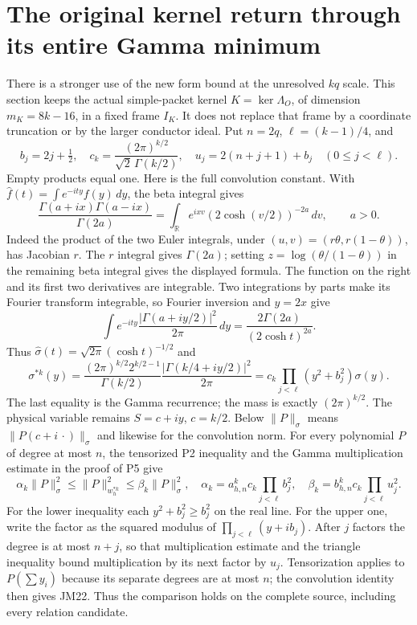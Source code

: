 \section{The original kernel return through its entire Gamma minimum}
There is a stronger use of the new form bound at the unresolved
$kq$ scale. This section keeps the actual simple-packet kernel
$K=\ker\Lambda_O$, of dimension $m_K=8k-16$, in a fixed frame $I_K$.
It does not replace that frame by a coordinate truncation or by the
larger conductor ideal. Put $n=2q$, $\ell=(k-1)/4$, and
\[
 b_j=2j+\tfrac12,\quad
 c_k=\frac{(2\pi)^{k/2}}{\sqrt2\,\Gamma(k/2)},\quad
 u_j=2(n+j+1)+b_j\quad(0\le j<\ell).
 \tag{JM21}
\]
Empty products equal one. Here is the full convolution constant.
With $\widehat f(t)=\int e^{-ity}f(y)\,dy$, the beta integral gives
\[
 \frac{\Gamma(a+ix)\Gamma(a-ix)}{\Gamma(2a)}
 =\int_{\mathbb R}e^{ixv}(2\cosh(v/2))^{-2a}\,dv,
 \qquad a>0.
\]
Indeed the product of the two Euler integrals, under
$(u,v)=(r\theta,r(1-\theta))$, has Jacobian $r$.
The $r$ integral gives $\Gamma(2a)$; setting
$z=\log(\theta/(1-\theta))$ in the remaining beta integral gives
the displayed formula. The function on the right and its first two
derivatives are integrable. Two integrations by parts make its
Fourier transform integrable, so Fourier inversion and $y=2x$ give
\[
 \int e^{-ity}\frac{|\Gamma(a+iy/2)|^2}{2\pi}\,dy
 =\frac{2\Gamma(2a)}{(2\cosh t)^{2a}}.
\]
Thus $\widehat\sigma(t)=\sqrt{2\pi}(\cosh t)^{-1/2}$ and
\[
 \sigma^{*k}(y)=
 \frac{(2\pi)^{k/2}2^{k/2-1}}{\Gamma(k/2)}
 \frac{|\Gamma(k/4+iy/2)|^2}{2\pi}
 =c_k\prod_{j<\ell}(y^2+b_j^2)\sigma(y).
\]
The last equality is the Gamma recurrence; the mass is exactly
$(2\pi)^{k/2}$. The physical variable remains $S=c+iy$, $c=k/2$.
Below $\|P\|_\sigma$ means $\|P(c+i\,\cdot)\|_\sigma$ and likewise
for the convolution norm. For every polynomial $P$ of degree at most $n$,
the tensorized P2 inequality and the Gamma multiplication estimate
in the proof of P5 give
\[
 \alpha_k\|P\|_\sigma^2\le\|P\|_{w_h^{*k}}^2
 \le\beta_k\|P\|_\sigma^2,\quad
 \alpha_k=a_{h,n}^kc_k\prod_{j<\ell}b_j^2,\quad
 \beta_k=b_{h,n}^kc_k\prod_{j<\ell}u_j^2.\tag{JM22}
\]
For the lower inequality each $y^2+b_j^2\ge b_j^2$ on the real
line. For the upper one, write the factor as the squared modulus
of $\prod_{j<\ell}(y+ib_j)$. After $j$ factors the degree is at
most $n+j$, so that multiplication estimate and the triangle inequality bound multiplication
by its next factor by $u_j$. Tensorization applies to $P(\sum y_i)$
because its separate degrees are at most $n$; the convolution
identity then gives JM22. Thus the comparison holds on the complete
source, including every relation candidate.

